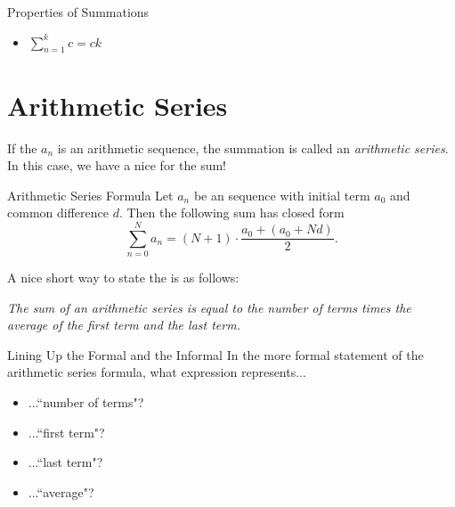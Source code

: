 \begin{exercise}{Properties of Summations \Coffeecup \Coffeecup \Coffeecup }
\begin{itemize}
\item  $\sum\limits_{n=1}^{k}  c =ck$
\end{itemize}
\end{exercise}

\section{Arithmetic Series} If the  $a_n$ is an arithmetic sequence, the summation is called an \emph{arithmetic series}.  In this case, we have a nice  for the sum!  

\begin{theorem}{Arithmetic Series Formula}  Let $a_n$ be an  sequence with initial term $a_0$ and common difference $d$.  Then the following sum has closed form $$\sum_{n=0}^N a_n = \left(N+1\right)\cdot\frac{a_0+\left(a_0+Nd\right)}{2}. $$
\end{theorem}

A nice short way to state the  is as follows: 
\begin{center}
\emph{The sum of an arithmetic series is equal to the number of terms times the average of the first term and the last term.}\end{center}

\begin{exercise}{Lining Up the Formal and the Informal \Coffeecup}
In the more formal statement of the arithmetic series formula, what expression represents... 
\begin{itemize}
\item ...``number of terms"?
\item ...``first term"?
\item ...``last term"?
\item ...``average"?
\end{itemize}
\end{exercise}

